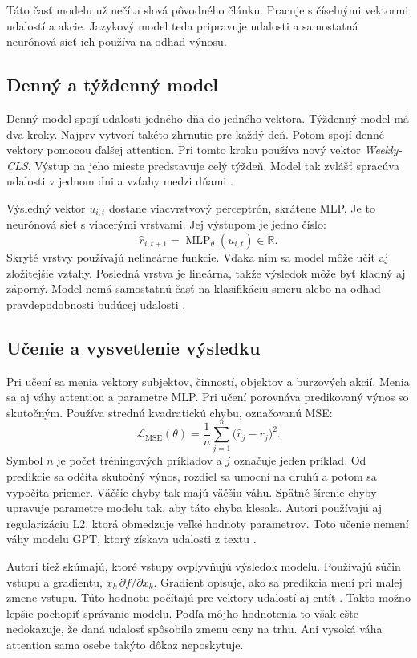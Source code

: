 Táto časť modelu už nečíta slová pôvodného článku. Pracuje s číselnými vektormi udalostí a akcie. Jazykový model teda pripravuje udalosti a samostatná neurónová sieť ich používa na odhad výnosu.

\subsection{Denný a týždenný model}
Denný model spojí udalosti jedného dňa do jedného vektora. Týždenný model má dva kroky. Najprv vytvorí takéto zhrnutie pre každý deň. Potom spojí denné vektory pomocou ďalšej attention. Pri tomto kroku používa nový vektor \emph{Weekly-CLS}. Výstup na jeho mieste predstavuje celý týždeň. Model tak zvlášť spracúva udalosti v jednom dni a vzťahy medzi dňami .

Výsledný vektor $u_{i,t}$ dostane viacvrstvový perceptrón, skrátene MLP. Je to neurónová sieť s viacerými vrstvami. Jej výstupom je jedno číslo:
\begin{equation}
\widehat r_{i,t+1}=\operatorname{MLP}_{\theta}(u_{i,t})\in\mathbb{R}.
\end{equation}
Skryté vrstvy používajú nelineárne funkcie. Vďaka nim sa model môže učiť aj zložitejšie vzťahy. Posledná vrstva je lineárna, takže výsledok môže byť kladný aj záporný. Model nemá samostatnú časť na klasifikáciu smeru alebo na odhad pravdepodobnosti budúcej udalosti .

\subsection{Učenie a vysvetlenie výsledku}
Pri učení sa menia vektory subjektov, činností, objektov a burzových akcií. Menia sa aj váhy attention a parametre MLP. Pri učení porovnáva predikovaný výnos so skutočným. Používa strednú kvadratickú chybu, označovanú MSE:
\begin{equation}
\mathcal{L}_{\mathrm{MSE}}(\theta)=\frac{1}{n}
\sum_{j=1}^{n}\bigl(\widehat r_j-r_j\bigr)^2.
\label{eq:loss}
\end{equation}
Symbol $n$ je počet tréningových príkladov a $j$ označuje jeden príklad. Od predikcie sa odčíta skutočný výnos, rozdiel sa umocní na druhú a potom sa vypočíta priemer. Väčšie chyby tak majú väčšiu váhu. Spätné šírenie chyby upravuje parametre modelu tak, aby táto chyba klesala. Autori používajú aj regularizáciu L2, ktorá obmedzuje veľké hodnoty parametrov. Toto učenie nemení váhy modelu GPT, ktorý získava udalosti z textu .

Autori tiež skúmajú, ktoré vstupy ovplyvňujú výsledok modelu. Používajú súčin vstupu a gradientu, $x_k\,\partial f/\partial x_k$. Gradient opisuje, ako sa predikcia mení pri malej zmene vstupu. Túto hodnotu počítajú pre vektory udalostí aj entít . Takto možno lepšie pochopiť správanie modelu. Podľa môjho hodnotenia to však ešte nedokazuje, že daná udalosť spôsobila zmenu ceny na trhu. Ani vysoká váha attention sama osebe takýto dôkaz neposkytuje.
